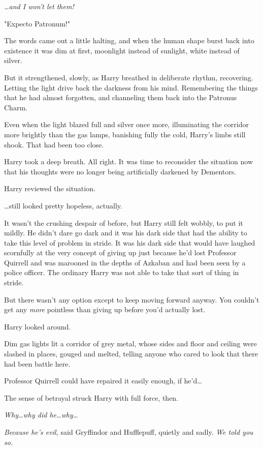 \emph{…and I won't let them!}

"Expecto Patronum!"

The words came out a little halting, and when the human shape burst back into
existence it was dim at first, moonlight instead of sunlight, white instead of
silver.

But it strengthened, slowly, as Harry breathed in deliberate rhythm,
recovering. Letting the light drive back the darkness from his mind.
Remembering the things that he had almost forgotten, and channeling them back
into the Patronus Charm.

Even when the light blazed full and silver once more, illuminating the corridor
more brightly than the gas lamps, banishing fully the cold, Harry's limbs still
shook. That had been too close.

Harry took a deep breath. All right. It was time to reconsider the situation
now that his thoughts were no longer being artificially darkened by Dementors.

Harry reviewed the situation.

…still looked pretty hopeless, actually.

It wasn't the crushing despair of before, but Harry still felt wobbly, to put
it mildly. He didn't dare go dark and it was his dark side that had the ability
to take this level of problem in stride. It was his dark side that would have
laughed scornfully at the very concept of giving up just because he'd lost
Professor Quirrell and was marooned in the depths of Azkaban and had been seen
by a police officer. The ordinary Harry was not able to take that sort of thing
in stride.

But there wasn't any option except to keep moving forward anyway. You couldn't
get any \emph{more} pointless than giving up before you'd actually lost.

Harry looked around.

Dim gas lights lit a corridor of grey metal, whose sides and floor and ceiling
were slashed in places, gouged and melted, telling anyone who cared to look
that there had been battle here.

Professor Quirrell could have repaired it easily enough, if he'd…

The sense of betrayal struck Harry with full force, then.

\emph{Why…why did he…why…}

\emph{Because he's evil,} said Gryffindor and Hufflepuff, quietly and sadly.
\emph{We told you so.}

